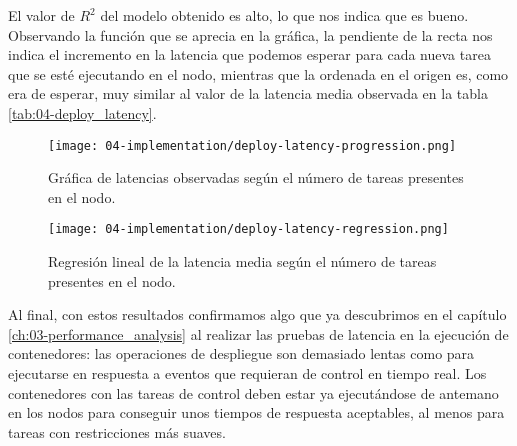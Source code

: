 El valor de $R^{2}$ del modelo obtenido es alto, lo que nos indica que es bueno.
Observando la función que se aprecia en la gráfica, la pendiente de la recta nos
indica el incremento en la latencia que podemos esperar para cada nueva tarea
que se esté ejecutando en el nodo, mientras que la ordenada en el origen es,
como era de esperar, muy similar al valor de la latencia media observada en la
tabla \ref{tab:04-deploy_latency}.

\begin{figure}
    \centering
    \texttt{[image: 04-implementation/deploy-latency-progression.png]}
    \caption{Gráfica de latencias observadas según el número de tareas presentes
        en el nodo.}
    \label{fig:04-deploy_latency_progression}
\end{figure}

\begin{figure}
    \centering
    \texttt{[image: 04-implementation/deploy-latency-regression.png]}
    \caption{Regresión lineal de la latencia media según el número de tareas
        presentes en el nodo.}
    \label{fig:04-deploy_latency_regression}
\end{figure}

Al final, con estos resultados confirmamos algo que ya descubrimos en el
capítulo \ref{ch:03-performance_analysis} al realizar las pruebas de latencia en
la ejecución de contenedores: las operaciones de despliegue son demasiado lentas
como para ejecutarse en respuesta a eventos que requieran de control en tiempo
real. Los contenedores con las tareas de control deben estar ya ejecutándose de
antemano en los nodos para conseguir unos tiempos de respuesta aceptables, al
menos para tareas con restricciones más suaves.